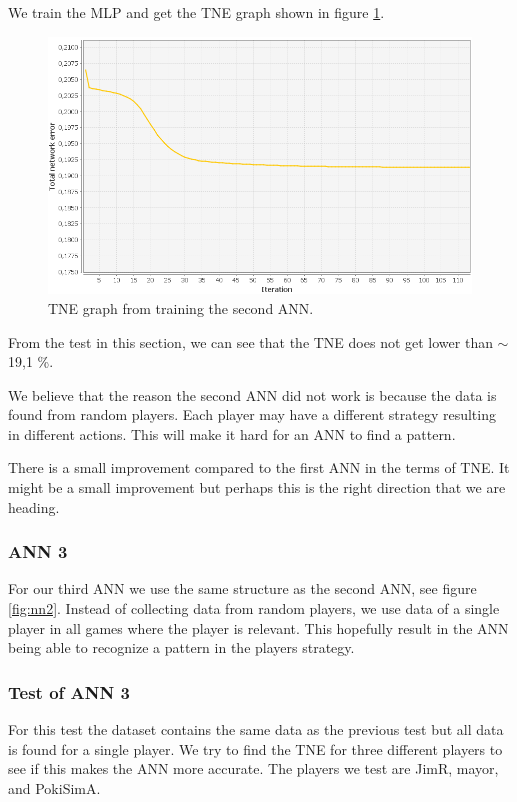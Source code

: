 We train the MLP and get the TNE graph shown in figure \ref{fig:tneg2}.

\begin{figure}[H]
  \center
    \includegraphics[scale=0.6]{images/nn/default-nn2-err.png}
  \caption{TNE graph from training the second ANN.\label{fig:tneg2}}
\end{figure}

From the test in this section, we can see that the TNE does not get lower than $\sim$19,1 \%. 


We believe that the reason the second ANN did not work is because the data is found from random players. Each player may have a different strategy resulting in different actions. This will make it hard for an ANN to find a pattern. 

There is a small improvement compared to the first ANN in the terms of TNE. It might be a small improvement but perhaps this is the right direction that we are heading.



\subsubsection{ANN 3}
\label{sec:design3}
For our third ANN we use the same structure as the second ANN, see figure \ref{fig:nn2}. Instead of collecting data from random players, we use data of a single player in all games where the player is relevant. This hopefully result in the ANN being able to recognize a pattern in the players strategy.

\subsubsection{Test of ANN 3}
\label{sec:ann-test3}
For this test the dataset contains the same data as the previous test but all data is found for a single player. We try to find the TNE for three different players to see if this makes the ANN more accurate. The players we test are JimR, mayor, and PokiSimA.

